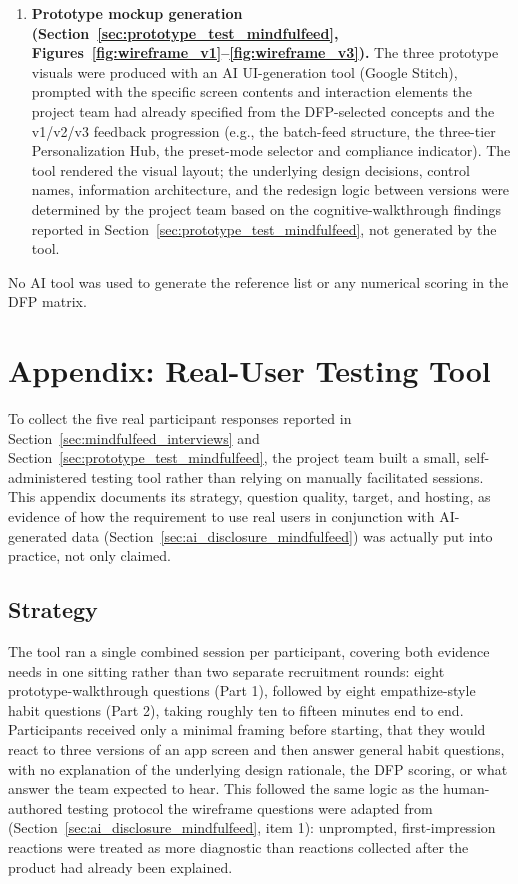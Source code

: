 \documentclass[11pt]{article}
\begin{document}
\begin{enumerate}
\item \textbf{Prototype mockup generation (Section~\ref{sec:prototype_test_mindfulfeed}, Figures~\ref{fig:wireframe_v1}--\ref{fig:wireframe_v3}).} The three prototype visuals were produced with an AI UI-generation tool (Google Stitch), prompted with the specific screen contents and interaction elements the project team had already specified from the DFP-selected concepts and the v1/v2/v3 feedback progression (e.g., the batch-feed structure, the three-tier Personalization Hub, the preset-mode selector and compliance indicator). The tool rendered the visual layout; the underlying design decisions, control names, information architecture, and the redesign logic between versions were determined by the project team based on the cognitive-walkthrough findings reported in Section~\ref{sec:prototype_test_mindfulfeed}, not generated by the tool.
\end{enumerate}

No AI tool was used to generate the reference list or any numerical scoring in the DFP matrix.

\clearpage
\section{Appendix: Real-User Testing Tool}
\label{sec:testing_tool_appendix}
To collect the five real participant responses reported in Section~\ref{sec:mindfulfeed_interviews} and Section~\ref{sec:prototype_test_mindfulfeed}, the project team built a small, self-administered testing tool rather than relying on manually facilitated sessions. This appendix documents its strategy, question quality, target, and hosting, as evidence of how the requirement to use real users in conjunction with AI-generated data (Section~\ref{sec:ai_disclosure_mindfulfeed}) was actually put into practice, not only claimed.

\subsection{Strategy}
The tool ran a single combined session per participant, covering both evidence needs in one sitting rather than two separate recruitment rounds: eight prototype-walkthrough questions (Part 1), followed by eight empathize-style habit questions (Part 2), taking roughly ten to fifteen minutes end to end. Participants received only a minimal framing before starting, that they would react to three versions of an app screen and then answer general habit questions, with no explanation of the underlying design rationale, the DFP scoring, or what answer the team expected to hear. This followed the same logic as the human-authored testing protocol the wireframe questions were adapted from (Section~\ref{sec:ai_disclosure_mindfulfeed}, item 1): unprompted, first-impression reactions were treated as more diagnostic than reactions collected after the product had already been explained.
\end{document}
